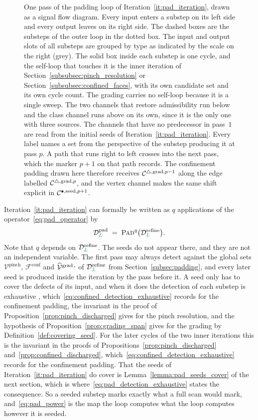 \documentclass[a4paper, 12pt]{article}
\makeatletter
\newcommand{\robert}[1]{{\color{orange} #1}}
\DeclareRobustCommand{\gradeClasses}[1][]{\widehat{\V}^{\mathrm{grad} \, \ifx\@empty#1\@empty\else,#1\fi}}
\DeclareRobustCommand{\candV}[1][]{\mathcal{C}^{\bullet\ifx\@empty#1\@empty\else,#1\fi}}
\DeclareRobustCommand{\candF}[1][]{\mathcal{C}^{\triangle\ifx\@empty#1\@empty\else,#1\fi}}
\newcommand{\green}{\color{ForestGreen}}
\newcommand{\V}{\mathcal{V}}
\newcommand{\F}{\mathcal{F}}
\renewcommand{\L}{{\green L}}
\theoremstyle{definition}
\theoremstyle{plain}
\numberwithin{equation}{section}
\newcommand{\tobecut}[1]{{\color{red} #1}}     %
\DeclareRobustCommand{\domseq}[1][]{\mathcal{D}\ifx\@empty#1\@empty\else_{#1}\fi}
\makeatother
\begin{document}
\begin{figure}[!tb]
    \caption{One pass of the padding loop of Iteration~\ref{it:pad_iteration}, drawn as a signal flow diagram. Every input enters a substep on its left side and every output leaves on its right side. The dashed boxes are the substeps of the outer loop in the dotted box. The input and output slots of all substeps are grouped by type as indicated by the scale on the right (grey). The solid box inside each substep is one cycle, and the self-loop that touches it is the inner iteration of Section~\ref{subsubsec:pinch_resolution} or Section~\ref{subsubsec:confined_faces}, with its own candidate set and its own cycle count. The grading carries no self-loop because it is a single sweep. The two channels that restore admissibility run below and the class channel runs above on its own, since it is the only one with three sources. The channels that have no predecessor in pass~$1$ are read from the initial seeds of Iteration~\ref{it:pad_iteration}. Every label names a set from the perspective of the substep producing it at pass $p$. A path that runs right to left crosses into the next pass, which the marker $p\!+\!1$ on that path records. The confinement padding drawn here therefore receives $\candF[\mathrm{grad},p-1]$ along the edge labelled $\candF[\mathrm{grad},p]$, and the vertex channel makes the same shift explicit in $\candV[\mathrm{seed},p+1]$.}
    \label{fig:padding_signal_flow}
\end{figure}

Iteration~\ref{it:pad_iteration} can formally be written as $q$ applications of the operator~\eqref{eq:pad_operator} by
\begin{equation}
    \label{eq:pad_power}
    \domseq[\L]^{\mathrm{pad}} \; = \; \textsc{Pad}^{q} \big( \domseq[\L]^{\mathrm{refine}} \big).
\end{equation}
Note that $q$ depends on $\domseq[\L]^{\mathrm{refine}}$. The seeds do not appear there, and they are not an independent variable. The first pass may always detect against the global sets $\V^{\mathrm{pinch}}$, $\F^{\mathrm{conf}}$ and $\gradeClasses$ of $\domseq[\L]^{\mathrm{refine}}$ from Section~\ref{subsec:padding}, and every later seed is produced inside the iteration by the pass before it. A seed only has to cover the defects of its input, and when it does the detection of each substep is exhaustive\tobecut{, which~\eqref{eq:confined_detection_exhaustive} records for the confinement padding, the invariant in the proof of Proposition~\ref{prop:pinch_discharged} gives for the pinch resolution, and the hypothesis of Proposition~\ref{prop:grading_span} gives for the grading}\robert{ by Definition~\ref{def:covering_seed}. For the later cycles of the two inner iterations this is the invariant in the proofs of Propositions~\ref{prop:pinch_discharged} and~\ref{prop:confined_discharged}, which~\eqref{eq:confined_detection_exhaustive} records for the confinement padding}. \robert{That the seeds of Iteration~\ref{it:pad_iteration} do cover is Lemma~\ref{lemma:pad_seeds_cover} of the next section, which is where~\eqref{eq:pad_detection_exhaustive} states the consequence.} So a seeded substep marks exactly what a full scan would mark, and~\eqref{eq:pad_power} is \tobecut{the map the loop computes}\robert{what the loop computes} however it is seeded.
\end{document}
